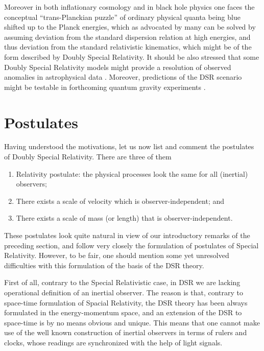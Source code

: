 \documentclass[a4paper,a4paper]{article}
\begin{document}
Moreover in both inflationary cosmology \cite{cosmo} and in black hole physics \cite{bh} one faces the conceptual ``trans-Planckian puzzle'' of ordinary physical quanta being blue shifted up to the Planck energies, which as advocated by many can be solved by assuming deviation from the standard dispersion relation at high energies, and thus deviation from the standard relativistic kinematics, which might be of the form described by Doubly Special Relativity. It should be also stressed that some Doubly Special Relativity models might provide a resolution of observed anomalies in astrophysical data \cite{astro}. Moreover, predictions of the DSR scenario might be testable in forthcoming quantum gravity experiments \cite{qg}.

\section{Postulates}

Having understood the motivations, let us now list and comment the postulates of Doubly Special Relativity. There are three of them

\begin{enumerate}
\item Relativity postulate: the physical processes look the same for all (inertial) observers;
\item There exists a scale of velocity \coordHE{} which is observer-independent; and
\item There exists a scale of mass \myHighlight{$\kappa$}\coordHE{} (or length) that is observer-independent.
\end{enumerate}

These postulates look quite natural in view of our introductory remarks of the preceding section, and follow very closely the formulation of postulates of Special Relativity. However, to be fair, one should mention some yet unresolved difficulties with this formulation of the basis of the DSR theory.

First of all, contrary to the Special Relativistic case, in DSR we are lacking operational definition of an inertial observer. The reason is that, contrary to space-time formulation of Spacial Relativity, the DSR theory has been always formulated in the energy-momentum space, and an extension of the DSR to space-time is by no means obvious and unique. This means that one cannot make use of the well known construction of inertial observers in terms of rulers and clocks, whose readings are synchronized with the help of light signals.
\end{document}
